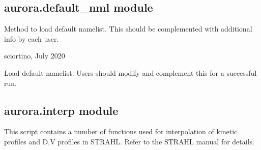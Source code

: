 \documentclass[letterpaper,10pt,english]{sphinxmanual}
\begin{document}
\subsection{aurora.default\_nml module}
\label{\detokenize{aurora:module-aurora.default_nml}}\label{\detokenize{aurora:aurora-default-nml-module}}
Method to load default namelist. This should be complemented with additional info 
by each user.

sciortino, July 2020

\begin{fulllineitems}
\label{\detokenize{aurora:aurora.default_nml.load_default_namelist}}
Load default namelist. 
Users should modify and complement this for a successful run.

\end{fulllineitems}



\subsection{aurora.interp module}
\label{\detokenize{aurora:module-aurora.interp}}\label{\detokenize{aurora:aurora-interp-module}}
This script contains a number of functions used for interpolation of kinetic profiles and D,V profiles in STRAHL.
Refer to the STRAHL manual for details.

\begin{fulllineitems}
\label{\detokenize{aurora:aurora.interp.exppol0}}
\end{fulllineitems}

\end{document}
